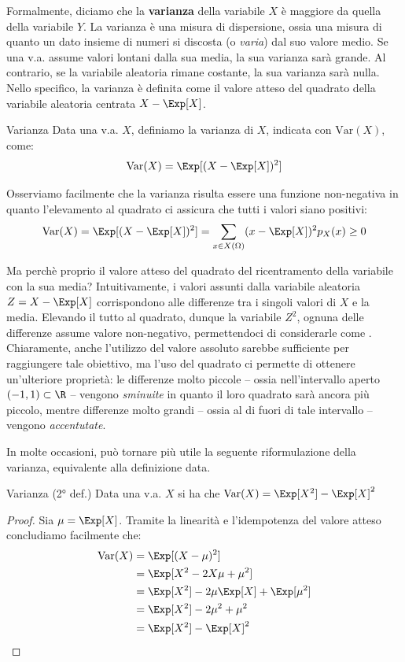 \documentclass[a4paper, 12pt]{report}
\begin{document}
    Formalmente, diciamo che la \textbf{varianza} della variabile $X$ è maggiore da quella della variabile $Y$. La varianza è una misura di dispersione, ossia una misura di quanto un dato insieme di numeri si discosta (o \textit{varia}) dal suo valore medio. Se una v.a. assume valori lontani dalla sua media, la sua varianza sarà grande. Al contrario, se la variabile aleatoria rimane costante, la sua varianza sarà nulla. Nello specifico, la varianza è definita come il valore atteso del quadrato della variabile aleatoria centrata $X - \Exp[X]$.

    \begin{frameddefn}{Varianza}
        Data una v.a. $X$, definiamo la varianza di $X$, indicata con $\mathrm{Var}(X)$, come:
        \[\mathrm{Var}(X) = \Exp[(X-\Exp[X])^2]\]
    \end{frameddefn}

    Osserviamo facilmente che la varianza risulta essere una funzione non-negativa in quanto l'elevamento al quadrato ci assicura che tutti i valori siano positivi:
    \[\mathrm{Var}(X) = \Exp[(X-\Exp[X])^2] = \sum_{x \in X(\Omega)} (x-\Exp[X])^2 p_X(x) \geq 0\]

    Ma perchè proprio il valore atteso del quadrato del ricentramento della variabile con la sua media? Intuitivamente, i valori assunti dalla variabile aleatoria $Z = X - \Exp[X]$ corrispondono alle differenze tra i singoli valori di $X$ e la media. Elevando il tutto al quadrato, dunque la variabile $Z^2$, ognuna delle differenze assume valore non-negativo, permettendoci di considerarle come . Chiaramente, anche l'utilizzo del valore assoluto sarebbe sufficiente per raggiungere tale obiettivo, ma l'uso del quadrato ci permette di ottenere un'ulteriore proprietà: le differenze molto piccole -- ossia nell'intervallo aperto $(-1,1) \subset \R$ -- vengono \textit{sminuite} in quanto il loro quadrato sarà ancora più piccolo, mentre differenze molto grandi -- ossia al di fuori di tale intervallo -- vengono \textit{accentutate}.

    In molte occasioni, può tornare più utile la seguente riformulazione della varianza, equivalente alla definizione data.

    \begin{framedthm}{Varianza (2° def.)}
        Data una v.a. $X$ si ha che $\mathrm{Var}(X) = \Exp[X^2]-\Exp[X]^2$
    \end{framedthm}

    \begin{proof}
        Sia $\mu = \Exp[X]$. Tramite la linearità e l'idempotenza del valore atteso concludiamo facilmente che:
        \[\begin{split}
            \mathrm{Var}(X) &= \Exp[(X-\mu)^2] \\
            &= \Exp[X^2 - 2X\mu + \mu^2] \\
            &= \Exp[X^2]- 2\mu\Exp[X] + \Exp[\mu^2] \\
            &= \Exp[X^2]- 2\mu^2 + \mu^2 \\
            &= \Exp[X^2]- \Exp[X]^2 \\
        \end{split}\]
    \end{proof}
\end{document}
